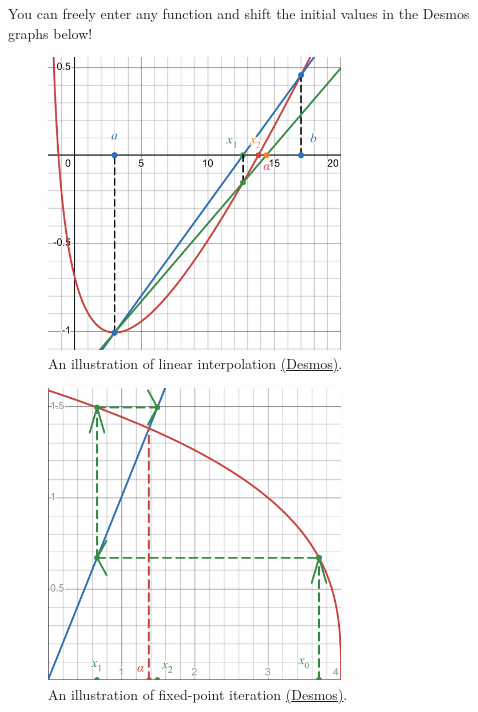 \documentclass[../Notes.tex]{subfiles}
\begin{document}
    You can freely enter any function and shift the initial values in the Desmos graphs below!
    \newpage
    \begin{figure}[H]
        \centering
        \includegraphics[width=0.69\textwidth]{../Diagrams/linear-interpolation.pdf}
        \caption{An illustration of linear interpolation \href{https://www.desmos.com/calculator/jp52nra5le}{(Desmos)}.}
        \label{fig:linear-interpolation}
    \end{figure}
    \begin{figure}[H]
        \centering
        \includegraphics[width=0.69\textwidth]{../Diagrams/fixed-point-iteration/fixed-point-iteration-desmos.pdf}
        \caption{An illustration of fixed-point iteration \href{https://www.desmos.com/calculator/t9mnqtmhxw}{(Desmos)}.}
        \label{fig:fixed-point-iteration}
    \end{figure}
\end{document}
